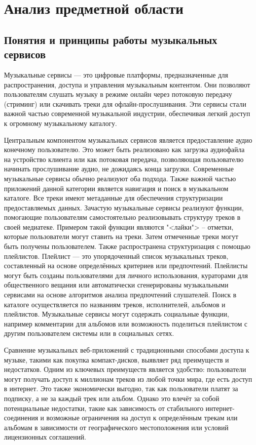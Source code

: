 \section{Анализ предметной области}

\subsection{Понятия и принципы работы музыкальных сервисов}

Музыкальные сервисы — это цифровые платформы, предназначенные для распространения, доступа и управления музыкальным контентом. Они позволяют пользователям слушать музыку в режиме онлайн через потоковую передачу (стриминг) или скачивать треки для офлайн-прослушивания. Эти сервисы стали важной частью современной музыкальной индустрии, обеспечивая легкий доступ к огромному музыкальному каталогу\cite{mus1}.

Центральным компонентом музыкальных сервисов является предоставление аудио конечному пользователю. Это может быть реализовано как загрузка аудиофайла на устройство клиента или как потоковая передача, позволяющая пользователю начинать прослушивание аудио, не дожидаясь конца загрузки. Современные музыкальные сервисы обычно реализуют оба подхода. Также важной частью приложений данной категории является навигация и поиск в музыкальном каталоге. Все треки имеют метаданные для обеспечения структуризации предоставляемых данных. Зачастую музыкальные сервисы реализуют функции, помогающие пользователям самостоятельно реализовывать структуру треков в своей медиатеке. Примером такой функции являются "<лайки"> -- отметки, которые пользователи могут ставить на треки. Затем отмеченные треки могут быть получены пользователем. Также распространена структуризация с помощью плейлистов. Плейлист — это упорядоченный список музыкальных треков, составленный на основе определённых критериев или предпочтений. Плейлисты могут быть созданы пользователями для личного использования, кураторами для общественного вещания или автоматически сгенерированы музыкальными сервисами на основе алгоритмов анализа предпочтений слушателей. Поиск в каталоге осуществляется по названиям треков, исполнителей, альбомов и плейлистов. Музыкальные сервисы могут содержать социальные функции, например комментарии для альбомов или возможность поделиться плейлистом с другим пользователем системы или в социальных сетях. 

Сравнение музыкальных веб-приложений с традиционными способами доступа к музыке, такими как покупка компакт-дисков, выявляет ряд преимуществ и недостатков. Одним из ключевых преимуществ является удобство: пользователи могут получать доступ к миллионам треков из любой точки мира, где есть доступ в интернет. Это также экономически выгодно, так как пользователи платят за подписку, а не за каждый трек или альбом. Однако это влечёт за собой потенциальные недостатки, такие как зависимость от стабильного интернет-соединения и возможные ограничения на доступ к определённым трекам или альбомам в зависимости от географического местоположения или условий лицензионных соглашений.

